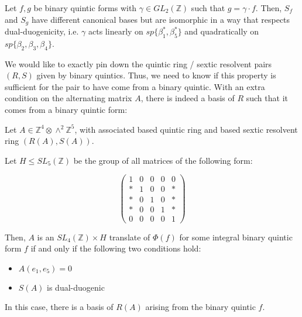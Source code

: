 \documentclass{article}
\begin{document}
\begin{theorem}
Let $f,g$ be binary quintic forms with $\gamma \in GL_2(\mathbb{Z})$ such that $g = \gamma \cdot f$.  Then, $S_f$ and $S_g$ have different canonical bases but are isomorphic in a way that respects dual-duogenicity, i.e. $\gamma$ acts linearly on $sp \{\beta_1^*, \beta_5^*\}$ and quadratically on $sp \{\beta_2,\beta_3,\beta_4\}$.
\end{theorem}

We would like to exactly pin down the quintic ring / sextic resolvent pairs $(R,S)$ given by binary quintics.  Thus, we need to know if this property is sufficient for the pair to have come from a binary quintic.  With an extra condition on the alternating matrix $A$, there is indeed a basis of $R$ such that it comes from a binary quintic form:
\begin{theorem}
Let $A \in \mathbb{Z}^4 \otimes \wedge^2 \mathbb{Z}^5$, with associated based quintic ring and based sextic resolvent ring $(R(A),S(A))$.

Let $H \leqslant SL_5(\mathbb{Z})$ be the group of all matrices of the following form:

\begin{equation}
\begin{pmatrix}
1 & 0 & 0 & 0 & 0 \\
* & 1 & 0 & 0 & * \\
* & 0 & 1 & 0 & * \\
* & 0 & 0 & 1 & * \\
0 & 0 & 0 & 0 & 1
\end{pmatrix}
\end{equation}

Then, $A$ is an $SL_4(\mathbb{Z}) \times H$ translate of $\Phi(f)$ for some integral binary quintic form $f$ if and only if the following two conditions hold:
\begin{itemize}
\item $A(e_1,e_5) = 0$
\item $S(A)$ is dual-duogenic
\end{itemize}

In this case, there is a basis of $R(A)$ arising from the binary quintic $f$.
\end{theorem}
\end{document}
